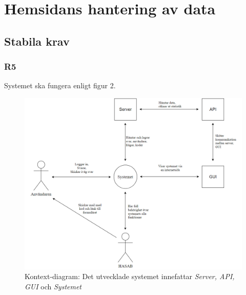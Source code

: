 \documentclass{article}
\begin{document}
    \newpage
     \section{Hemsidans hantering av data}
    
    \subsection*{Stabila krav}
    \subsubsection*{R5}
    Systemet ska fungera enligt figur 2.
    
    \begin{figure}[h!]
    \caption{Kontext-diagram: Det utvecklade systemet innefattar \textit{Server, API, GUI} och \textit{Systemet}}
    \includegraphics[width=150mm]{Kontextdiagram.png}
    
    \end{figure}
    
    \newpage
\end{document}
